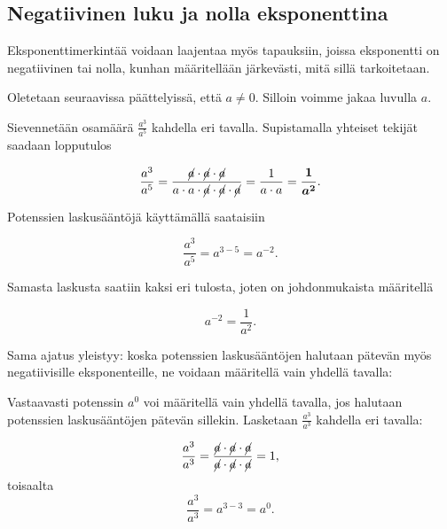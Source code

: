 \subsection*{Negatiivinen luku ja nolla eksponenttina}

Eksponenttimerkintää voidaan laajentaa myös tapauksiin, joissa eksponentti on negatiivinen tai nolla, kunhan määritellään järkevästi, mitä sillä tarkoitetaan.

Oletetaan seuraavissa päättelyissä, että $a \neq 0$. Silloin voimme jakaa luvulla $a$.
    
Sievennetään osamäärä $\frac{a^3}{a^5}$ kahdella eri tavalla. Supistamalla yhteiset tekijät saadaan lopputulos
    
    \begin{equation*}
        \frac{a^3}{a^5} =
        \frac{\cancel{a}\cdot \cancel{a}\cdot \cancel{a}}{a\cdot a\cdot
        \cancel{a}\cdot \cancel{a}\cdot \cancel{a}} = 
        \frac{1}{a\cdot a}=\boldsymbol{\frac{1}{a^2}}.
    \end{equation*}
    
Potenssien laskusääntöjä käyttämällä saataisiin
    
    \begin{equation*}
        \frac{a^3}{a^5} = a^{3-5}= a^{-2}{.}
    \end{equation*}
    
Samasta laskusta saatiin kaksi eri tulosta, joten on johdonmukaista
määritellä
    
    \begin{equation*}
        a^{-2} = \frac{1}{a^2}.
    \end{equation*}

Sama ajatus yleistyy: koska potenssien laskusääntöjen halutaan pätevän myös negatiivisille
eksponenteille, ne voidaan määritellä vain yhdellä tavalla:
  
    
Vastaavasti potenssin $a^0$ voi määritellä vain yhdellä tavalla, jos halutaan
potenssien laskusääntöjen pätevän sillekin. Lasketaan $\frac{a^3}{a^3}$
kahdella eri tavalla:

    \[
        \frac{a^3}{a^3}=\frac{\cancel{a}\cdot \cancel{a}\cdot \cancel{a}}
        {\cancel{a}\cdot \cancel{a}\cdot \cancel{a}}=1,
    \]
	toisaalta
 \[ \frac{a^3}{a^3}=a^{3-3}=a^0. \]


